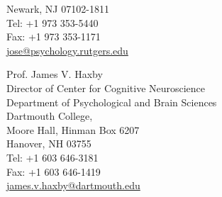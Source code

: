 \documentclass[12pt,overlapped,line]{res}
\begin{document}
\begin{resume}
\begin{multicols}{2}
{    Newark, NJ 07102-1811 \\
    Tel: +1 973 353-5440 \\
    Fax: +1 973 353-1171 \\
    \url{jose@psychology.rutgers.edu}
 }
 \end{multicols}
\vspace{-1em}
{\small
Prof. James V. Haxby \\
Director of Center for Cognitive Neuroscience \\
Department of Psychological and Brain Sciences \\
Dartmouth College, \\
Moore Hall, Hinman Box 6207 \\
Hanover, NH 03755 \\
Tel: +1 603 646-3181 \\
Fax: +1 603 646-1419 \\
\url{james.v.haxby@dartmouth.edu} \\
}



\end{resume}
\end{document}
